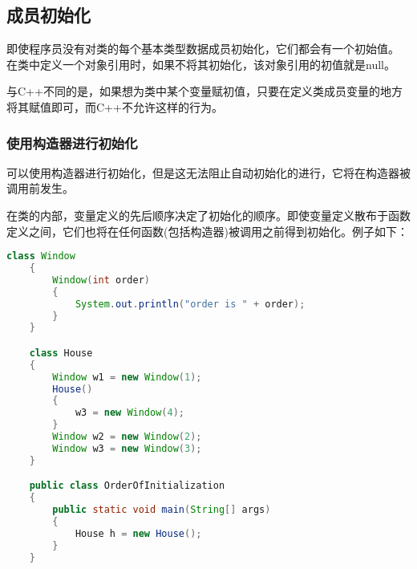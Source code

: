 \documentclass[a4paper,left=2.5cm,right=2.5cm,11pt]{article}
\begin{document}
\subsection{成员初始化}
	即使程序员没有对类的每个基本类型数据成员初始化，它们都会有一个初始值。
	在类中定义一个对象引用时，如果不将其初始化，该对象引用的初值就是null。\par
	与C++不同的是，如果想为类中某个变量赋初值，只要在定义类成员变量的地方将其赋值即可，而C++不允许这样的行为。

\subsubsection{使用构造器进行初始化}
	可以使用构造器进行初始化，但是这无法阻止自动初始化的进行，它将在构造器被调用前发生。\par
	在类的内部，变量定义的先后顺序决定了初始化的顺序。即使变量定义散布于函数定义之间，它们也将在任何函数(包括构造器)被调用之前得到初始化。例子如下：
	\begin{lstlisting}[language = Java]
	class Window
	{
		Window(int order)
		{
			System.out.println("order is " + order);
		}
	}

	class House
	{
		Window w1 = new Window(1);
		House()
		{
			w3 = new Window(4);
		}
		Window w2 = new Window(2);
		Window w3 = new Window(3);
	}

	public class OrderOfInitialization
	{
		public static void main(String[] args)
		{
			House h = new House();
		}
	}
	\end{lstlisting}
\end{document}
